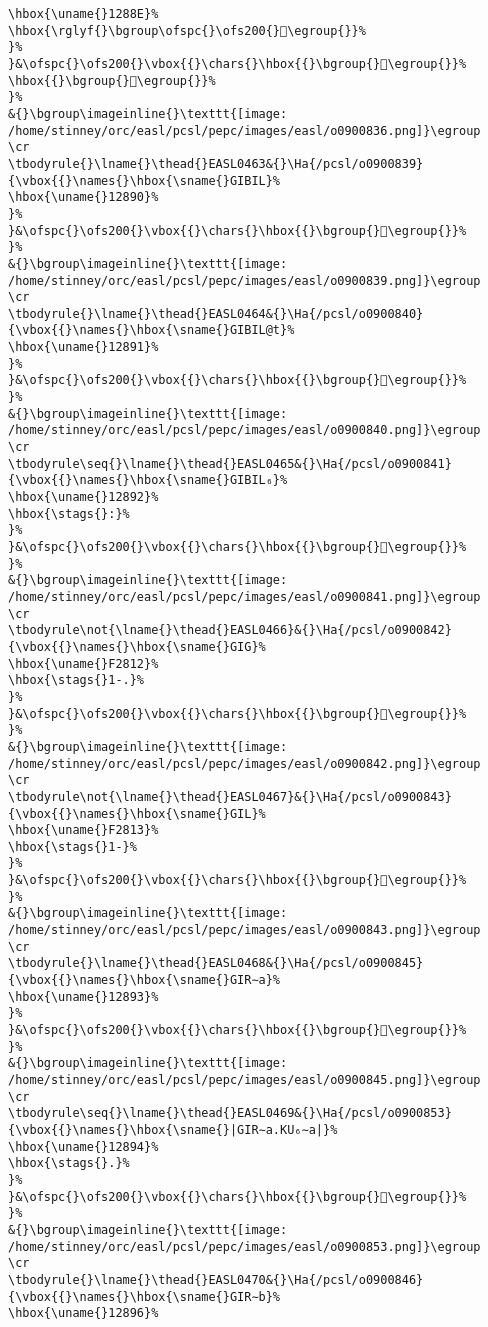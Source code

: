 \begin{verbatim}
\hbox{\uname{}1288E}%
\hbox{\rglyf{}\bgroup\ofspc{}\ofs200{}𒢎\egroup{}}%
}%
}&\ofspc{}\ofs200{}\vbox{{}\chars{}\hbox{{}\bgroup{}𒢏\egroup{}}%
\hbox{{}\bgroup{}𒢎\egroup{}}%
}%
&{}\bgroup\imageinline{}\texttt{[image: /home/stinney/orc/easl/pcsl/pepc/images/easl/o0900836.png]}\egroup
\cr
\tbodyrule{}\lname{}\thead{}EASL0463&{}\Ha{/pcsl/o0900839}{\vbox{{}\names{}\hbox{\sname{}GIBIL}%
\hbox{\uname{}12890}%
}%
}&\ofspc{}\ofs200{}\vbox{{}\chars{}\hbox{{}\bgroup{}𒢐\egroup{}}%
}%
&{}\bgroup\imageinline{}\texttt{[image: /home/stinney/orc/easl/pcsl/pepc/images/easl/o0900839.png]}\egroup
\cr
\tbodyrule{}\lname{}\thead{}EASL0464&{}\Ha{/pcsl/o0900840}{\vbox{{}\names{}\hbox{\sname{}GIBIL@t}%
\hbox{\uname{}12891}%
}%
}&\ofspc{}\ofs200{}\vbox{{}\chars{}\hbox{{}\bgroup{}𒢑\egroup{}}%
}%
&{}\bgroup\imageinline{}\texttt{[image: /home/stinney/orc/easl/pcsl/pepc/images/easl/o0900840.png]}\egroup
\cr
\tbodyrule\seq{}\lname{}\thead{}EASL0465&{}\Ha{/pcsl/o0900841}{\vbox{{}\names{}\hbox{\sname{}GIBIL₆}%
\hbox{\uname{}12892}%
\hbox{\stags{}:}%
}%
}&\ofspc{}\ofs200{}\vbox{{}\chars{}\hbox{{}\bgroup{}𒢒\egroup{}}%
}%
&{}\bgroup\imageinline{}\texttt{[image: /home/stinney/orc/easl/pcsl/pepc/images/easl/o0900841.png]}\egroup
\cr
\tbodyrule\not{\lname{}\thead{}EASL0466}&{}\Ha{/pcsl/o0900842}{\vbox{{}\names{}\hbox{\sname{}GIG}%
\hbox{\uname{}F2812}%
\hbox{\stags{}1-.}%
}%
}&\ofspc{}\ofs200{}\vbox{{}\chars{}\hbox{{}\bgroup{}󲠒\egroup{}}%
}%
&{}\bgroup\imageinline{}\texttt{[image: /home/stinney/orc/easl/pcsl/pepc/images/easl/o0900842.png]}\egroup
\cr
\tbodyrule\not{\lname{}\thead{}EASL0467}&{}\Ha{/pcsl/o0900843}{\vbox{{}\names{}\hbox{\sname{}GIL}%
\hbox{\uname{}F2813}%
\hbox{\stags{}1-}%
}%
}&\ofspc{}\ofs200{}\vbox{{}\chars{}\hbox{{}\bgroup{}󲠓\egroup{}}%
}%
&{}\bgroup\imageinline{}\texttt{[image: /home/stinney/orc/easl/pcsl/pepc/images/easl/o0900843.png]}\egroup
\cr
\tbodyrule{}\lname{}\thead{}EASL0468&{}\Ha{/pcsl/o0900845}{\vbox{{}\names{}\hbox{\sname{}GIR∼a}%
\hbox{\uname{}12893}%
}%
}&\ofspc{}\ofs200{}\vbox{{}\chars{}\hbox{{}\bgroup{}𒢓\egroup{}}%
}%
&{}\bgroup\imageinline{}\texttt{[image: /home/stinney/orc/easl/pcsl/pepc/images/easl/o0900845.png]}\egroup
\cr
\tbodyrule\seq{}\lname{}\thead{}EASL0469&{}\Ha{/pcsl/o0900853}{\vbox{{}\names{}\hbox{\sname{}|GIR∼a.KU₆∼a|}%
\hbox{\uname{}12894}%
\hbox{\stags{}.}%
}%
}&\ofspc{}\ofs200{}\vbox{{}\chars{}\hbox{{}\bgroup{}𒢔\egroup{}}%
}%
&{}\bgroup\imageinline{}\texttt{[image: /home/stinney/orc/easl/pcsl/pepc/images/easl/o0900853.png]}\egroup
\cr
\tbodyrule{}\lname{}\thead{}EASL0470&{}\Ha{/pcsl/o0900846}{\vbox{{}\names{}\hbox{\sname{}GIR∼b}%
\hbox{\uname{}12896}%

\end{verbatim}

